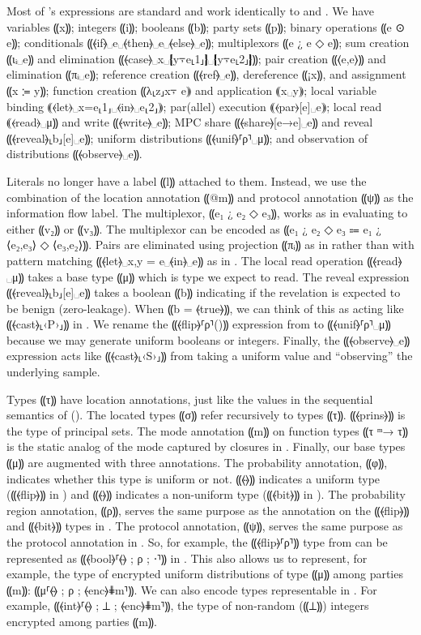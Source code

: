 Most of \lang's expressions are standard and work identically to \mpc and \obliv.
We have variables ⸨x⸩; integers ⸨i⸩; booleans ⸨b⸩; party sets ⸨p⸩;
binary operations ⸨e ⊙ e⸩;
conditionals ⸨⦑if⦒␣e␣⦑then⦒␣e␣⦑else⦒␣e⸩; multiplexors ⸨e ¿ e ◇ e⸩;
sum creation ⸨ιᵢ␣e⸩ and elimination ⸨⦑case⦒␣x␣❴y⍪e⸤1⸥❵␣❴y⍪e⸤2⸥❵⸩;
pair creation ⸨⟨e,e⟩⸩ and elimination ⸨πᵢ␣e⸩;
reference creation ⸨⦑ref⦒␣e⸩, dereference ⸨¡x⸩, and assignment ⸨x ≔ y⸩;
function creation ⸨λ⸤z⸥x⍪ e⸩ and application ⸨x␣y⸩;
local variable binding ⸨⦑let⦒␣x=e⸤1⸥␣⦑in⦒␣e⸤2⸥⸩;
par(allel) execution ⸨⦑par⦒[e]␣e⸩;
local read ⸨⦑read⦒␣μ⸩ and write ⸨⦑write⦒␣e⸩;
MPC share ⸨⦑share⦒[e→e]␣e⸩ and reveal ⸨⦑reveal⦒⸤b⸥[e]␣e⸩;
uniform distributions ⸨⦑unif⦒⸢ρ⸣␣μ⸩;
and observation of distributions ⸨⦑observe⦒␣e⸩.

Literals no longer have a label ⸨l⸩ attached to them. Instead, we use
the combination of the location annotation ⸨@m⸩ and protocol annotation
⸨ψ⸩ as the information flow label.
The multiplexor, ⸨e₁ ¿ e₂ ◇ e₃⸩, works as in \mpc evaluating to either
⸨v₂⸩ or ⸨v₃⸩. The \obliv multiplexor can be encoded as
⸨e₁ ¿ e₂ ◇ e₃ ⩴ e₁ ¿ ⟨e₂,e₃⟩ ◇ ⟨e₃,e₂⟩⸩. Pairs are eliminated using
projection ⸨πᵢ⸩ as in \mpc rather than with pattern matching ⸨⦑let⦒␣x,y = e␣⦑in⦒␣e⸩
as in \obliv. The local read operation ⸨⦑read⦒␣μ⸩ takes a base type ⸨μ⸩ which is
type we expect to read. The reveal expression ⸨⦑reveal⦒⸤b⸥[e]␣e⸩ takes a boolean
⸨b⸩ indicating if the revelation is expected to be benign (zero-leakage). When
⸨b = ⦑true⦒⸩, we can think of this as acting like ⸨⦑cast⦒⸤‹P›⸥⸩ in \obliv. We rename
the ⸨⦑flip⦒⸢ρ⸣()⸩ expression from \obliv to ⸨⦑unif⦒⸢ρ⸣␣μ⸩ because we may generate
uniform booleans or integers. Finally, the ⸨⦑observe⦒␣e⸩ expression acts like ⸨⦑cast⦒⸤‹S›⸥⸩
from \obliv taking a uniform value and ``observing'' the underlying sample.

Types ⸨τ⸩ have location annotations, just like the values in the sequential semantics of \mpc ().
The located types ⸨σ⸩ refer recursively to types ⸨τ⸩. ⸨⦑prins⦒⸩ is the type of principal sets. The mode annotation ⸨m⸩ on function types ⸨τ ᵐ→ τ⸩ is the static
analog of the mode captured by closures in \mpc. Finally, our base types ⸨μ⸩ are augmented with three annotations. The probability
annotation, ⸨φ⸩, indicates whether this type is uniform or not. ⸨⦑\faThumbsUp⦒⸩ indicates a uniform type (⸨⦑flip⦒⸩ in
\obliv) and ⸨⦑\faThumbsDown⦒⸩ indicates a non-uniform type (⸨⦑bit⦒⸩ in \obliv). The probability region annotation, ⸨ρ⸩,
serves the same purpose as the annotation on the ⸨⦑flip⦒⸩ and ⸨⦑bit⦒⸩ types in \obliv. The protocol annotation, ⸨ψ⸩,
serves the same purpose as the protocol annotation in \mpc. So, for example, the ⸨⦑flip⦒⸢ρ⸣⸩ type from \obliv can be
represented as ⸨⦑bool⦒⸢⦑\faThumbsUp⦒ ; ρ ; ⋅⸣⸩ in \lang. This also allows us to represent, for example, the type
of encrypted uniform distributions of type ⸨μ⸩ among parties ⸨m⸩: ⸨μ⸢⦑\faThumbsUp⦒ ; ρ ; ⦑enc⦒⋕m⸣⸩. We can
also encode types representable in \mpc. For example, ⸨⦑int⦒⸢⦑\faThumbsDown⦒ ; ⊥ ; ⦑enc⦒⋕m⸣⸩, the type of non-random
(⸨⊥⸩) integers encrypted among parties ⸨m⸩.

